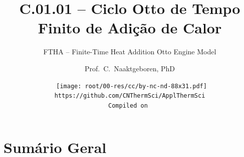 \makeatletter
\immediate{} %
\makeatother


\newcommand{\VPMS}{{\ensuremath V_{\mathrm{PMS}}}}
\newcommand{\VPMI}{{\ensuremath V_{\mathrm{PMI}}}}
\title{C.01.01 -- Ciclo Otto de Tempo Finito de Adição de Calor}
\subtitle{FTHA -- Finite-Time Heat Addition Otto Engine Model}
\author{Prof.~C.~Naaktgeboren, PhD}
\date{{\scriptsize\tt%
    \texttt{[image: root/00-res/cc/by-nc-nd-88x31.pdf]}\\[\smallskipamount]
    https://github.com/CNThermSci/ApplThermSci\\
    Compiled on 
}}

\logo{%
    \parbox{158mm}{%
        \texttt{[image: root/00-res/UTFPR/UTFPR-logo-A.pdf]}\hfill%
        \texttt{[image: root/00-res/logo/CNThermSci-logo-A.pdf]}%
}} %
\frame{\titlepage}

\section*{Sumário Geral}

